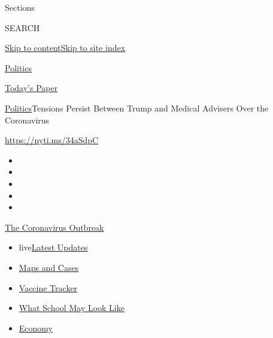 Sections

SEARCH

\protect\hyperlink{site-content}{Skip to
content}\protect\hyperlink{site-index}{Skip to site index}

\href{https://www.nytimes.com/section/politics}{Politics}

\href{https://myaccount.nytimes.com/auth/login?response_type=cookie\&client_id=vi}{}

\href{https://www.nytimes.com/section/todayspaper}{Today's Paper}

\href{/section/politics}{Politics}\textbar{}Tensions Persist Between
Trump and Medical Advisers Over the Coronavirus

\url{https://nyti.ms/34aSdpC}

\begin{itemize}
\item
\item
\item
\item
\item
\end{itemize}

\href{https://www.nytimes.com/news-event/coronavirus?action=click\&pgtype=Article\&state=default\&region=TOP_BANNER\&context=storylines_menu}{The
Coronavirus Outbreak}

\begin{itemize}
\tightlist
\item
  live\href{https://www.nytimes.com/2020/08/01/world/coronavirus-covid-19.html?action=click\&pgtype=Article\&state=default\&region=TOP_BANNER\&context=storylines_menu}{Latest
  Updates}
\item
  \href{https://www.nytimes.com/interactive/2020/us/coronavirus-us-cases.html?action=click\&pgtype=Article\&state=default\&region=TOP_BANNER\&context=storylines_menu}{Maps
  and Cases}
\item
  \href{https://www.nytimes.com/interactive/2020/science/coronavirus-vaccine-tracker.html?action=click\&pgtype=Article\&state=default\&region=TOP_BANNER\&context=storylines_menu}{Vaccine
  Tracker}
\item
  \href{https://www.nytimes.com/interactive/2020/07/29/us/schools-reopening-coronavirus.html?action=click\&pgtype=Article\&state=default\&region=TOP_BANNER\&context=storylines_menu}{What
  School May Look Like}
\item
  \href{https://www.nytimes.com/live/2020/07/31/business/stock-market-today-coronavirus?action=click\&pgtype=Article\&state=default\&region=TOP_BANNER\&context=storylines_menu}{Economy}
\end{itemize}

